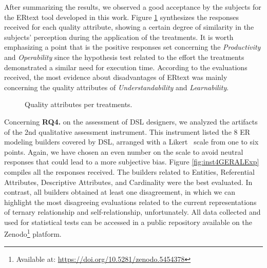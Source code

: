 After summarizing the results, we observed a good acceptance by the subjects for the ERtext tool developed in this work.
Figure \ref{fig:inst3GERALExp} synthesizes the responses received for each quality attribute, showing a certain degree of similarity in the subjects' perception during the application of the treatments.
It is worth emphasizing a point that is the positive responses set concerning the \textit{Productivity} and \textit{Operability} since the hypothesis test related to the effort the treatments demonstrated a similar need for execution time.
According to the evaluations received, the most evidence about disadvantages of ERtext was mainly concerning the quality attributes of \textit{Understandability} and \textit{Learnability}.

\begin{figure}[!htb]
    \centering
    \caption{Quality attributes per treatments.}
    \label{fig:inst3GERALExp}
    
\end{figure}

Concerning \textbf{RQ4.} on the assessment of DSL designers, we analyzed the artifacts of the 2nd qualitative assessment instrument.
This instrument listed the 8 ER modeling builders covered by DSL, arranged with a Likert~\cite{Likert} scale from one to six points.
Again, we have chosen an even number on the scale to avoid neutral responses that could lead to a more subjective bias.
Figure \ref{fig:inst4GERALExp} compiles all the responses received. 
The builders related to Entities, Referential Attributes, Descriptive Attributes, and Cardinality were the best evaluated.
In contrast, all builders obtained at least one disagreement, in which we can highlight the most disagreeing evaluations related to the current representations of ternary relationship and self-relationship, unfortunately.
All data collected and used for statistical tests can be accessed in a public repository available on the Zenodo\footnote{Available at: \url{https://doi.org/10.5281/zenodo.5454378}} platform.


